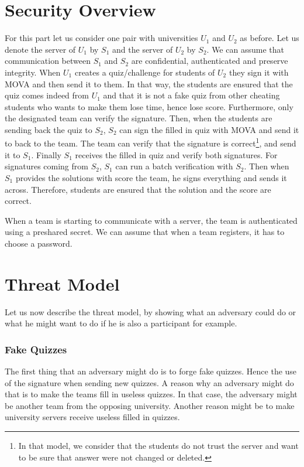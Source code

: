     \section{Security Overview}
    \label{sec:app-sec}
    For this part let us consider one pair with universities $U_1$ and $U_2$ as before. Let us denote the server of $U_1$ by $S_1$ and the server of $U_2$ by $S_2$.
    We can assume that communication between $S_1$ and $S_2$ are confidential, authenticated and preserve integrity.
    When $U_1$ creates a quiz/challenge for students of $U_2$ they sign it with MOVA and then send it to them. In that way, the students are ensured that the quiz comes indeed
    from $U_1$ and that it is not a fake quiz from other cheating students who wants to make them lose time, hence lose score. Furthermore, only the designated team can verify the signature.
    Then, when the students are sending back the quiz to $S_2$, $S_2$ can sign the filled in quiz with MOVA and send it to back to the team. The team can verify that the signature 
    is correct\footnote{In that model, we consider that the students do not trust the server and want to be sure that answer were not changed or deleted.},
    and send it to $S_1$. Finally $S_1$ receives the filled in quiz and verify both signatures.
    For signatures coming from $S_2$, $S_1$ can run a batch verification with $S_2$.
    Then when $S_1$ provides the solutions with score the team, he signs everything and sends it across. Therefore, students are ensured that the solution and the score are correct.

    When a team is starting to communicate with a server, the team is authenticated using a preshared secret. We can assume that when a team registers, it has to choose a password.

    \section{Threat Model}
    \label{sec:threat}
    Let us now describe the threat model, by showing what an adversary could do or what he might want to do if he is also a participant for example.
    \subsubsection{Fake Quizzes}
    The first thing that an adversary might do is to forge fake quizzes. Hence the use of the signature when sending new quizzes. A reason why an adversary might do that is  to
    make the teams fill in useless quizzes. In that case, the adversary might be another team from the opposing university. Another reason might be to make university servers receive 
    useless filled in quizzes.
